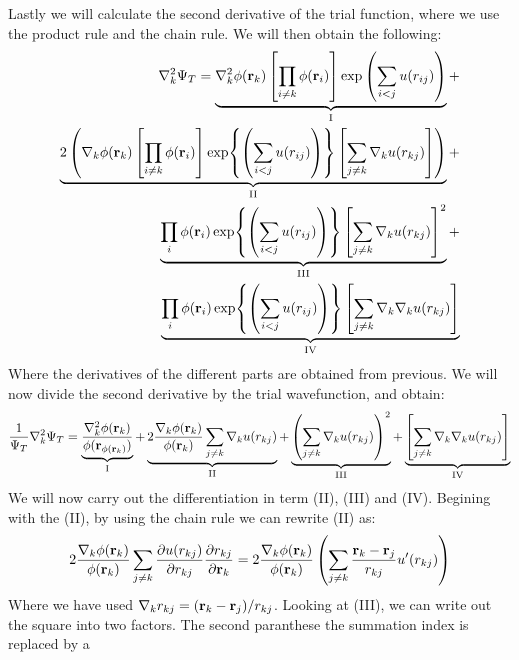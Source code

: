 \documentclass[a4paper, 10pt]{article}
\begin{document}
Lastly we will calculate the second derivative of the trial function, where we
use the product rule and the chain rule. We will then obtain the following:
\begin{align*}
  \begin{split}
  \nabla_{k}^2\Psi_{T} =
  \underbrace{\nabla_k^2 \phi(\mathbf{r}_k)\left[ \prod_{i\neq k} \phi(\mathbf{r}_i)\right]\exp\left(\sum_{i<j}u(r_{ij})\right)}_{\mathrm{I}} +\\
   \underbrace{2\left(\nabla_k \phi(\mathbf{r}_k)\left[ \prod_{i\neq k} \phi(\mathbf{r}_i)\right]
  \exp{\left(\sum_{i<j}u(r_{ij})\right)}
  \left[\sum_{j \neq k}\nabla_{k}u(r_{kj})\right]\right)}_{\mathrm{II}} +
  \\
   \underbrace{\prod_{i}\phi(\bold{r}_{i})
    \exp{\left(\sum_{i<j}u(r_{ij})\right)}
    \left[\sum_{j \neq k}\nabla_{k}u(r_{kj})\right]^2}_{\mathrm{III}} +
    \\
    \underbrace{\prod_{i}\phi(\bold{r}_{i})
      \exp{\left(\sum_{i<j}u(r_{ij})\right)}
      \left[\sum_{j \neq k}\nabla_{k}\nabla_{k}u(r_{kj})\right]}_{\mathrm{IV}}
  \end{split}
\end{align*}
Where the derivatives of the different parts are obtained from previous.
We will now divide the second derivative by the trial wavefunction, and obtain:
\begin{align}
\frac{1}{\Psi_{T}}\nabla_{k}^2\Psi_{T} =
\underbrace{\frac{\nabla_{k}^2\phi{(\bold{r}_{k})}}{\phi(\bold{r}_{\phi(\bold{r}_{k})})}}_{\mathrm{I}}
+ \underbrace{2\frac{\nabla_{k}\phi(\bold{r}_{k})}{\phi{(\bold{r}_{k})}}\sum_{j\neq k}\nabla_{k}u(r_{kj})}_{\mathrm{II}}
+ \underbrace{\left(\sum_{j\neq k}\nabla_{k} u(r_{kj})\right)^2}_{\mathrm{III}} +
\underbrace{\left[\sum_{j \neq k}\nabla_{k}\nabla_{k}u(r_{kj})\right]}_{\mathrm{IV}}
\end{align}
We will now carry out the differentiation in term (II), (III) and (IV). Begining with the
(II), by using the chain rule we can rewrite (II) as:
\begin{align*}
2\frac{\nabla_{k}\phi(\bold{r}_{k})}{\phi{(\bold{r}_{k})}}\sum_{j\neq k}\pdv{u(r_{kj})}{r_{kj}}\pdv{r_{kj}}{\bold{r}_{k}} =
2\frac{\nabla_{k}\phi(\bold{r}_{k})}{\phi{(\bold{r}_{k})}}\left(\sum_{j\neq k}\frac{\bold{r}_{k} - \bold{r}_{j}}{r_{kj}}u'(r_{kj})\right)
\end{align*}
Where we have used $\nabla_{k} r_{kj} = (\bold{r}_{k} - \bold{r}_{j})/r_{kj}$.
Looking at (III), we can write out the square into two factors. The second paranthese the summation index is replaced by a
\end{document}
